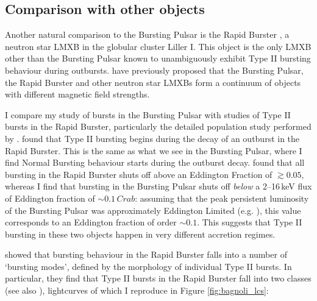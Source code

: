 \subsection{Comparison with other objects}

\par Another natural comparison to the Bursting Pulsar is the Rapid Burster \citep{Lewin_RBDiscovery}, a neutron star LMXB in the globular cluster Liller I.  This object is the only LMXB other than the Bursting Pulsar known to unambiguously exhibit Type II bursting behaviour during outbursts.  \citet{Rappaport_BPHistory} have previously proposed that the Bursting Pulsar, the Rapid Burster and other neutron star LMXBs form a continuum of objects with different magnetic field strengths.
\par I compare my study of bursts in the Bursting Pulsar with studies of Type II bursts in the Rapid Burster, particularly the detailed population study performed by \citet{Bagnoli_PopStudy}.  \citet{Bagnoli_PopStudy} found that Type II bursting begins during the decay of an outburst in the Rapid Burster.  This is the same as what we see in the Bursting Pulsar, where I find Normal Bursting behaviour starts during the outburst decay.  \citet{Bagnoli_PopStudy} found that all bursting in the Rapid Burster shuts off above an Eddington Fraction of $\gtrsim0.05$, whereas I find that bursting in the Bursting Pulsar shuts off \textit{below} a 2--16\,keV flux of Eddington fraction of $\sim0.1\,Crab$: assuming that the peak persistent luminosity of the Bursting Pulsar was approximately Eddington Limited (e.g. \citealp{Sazonov_BPGranat}), this value corresponds to an Eddington fraction of order $\sim0.1$.  This suggests that Type II bursting in these two objects happen in very different accretion regimes.
\par \citet{Bagnoli_PopStudy} showed that bursting behaviour in the Rapid Burster falls into a number of `bursting modes', defined by the morphology of individual Type II bursts.  In particular, they find that Type II bursts in the Rapid Burster fall into two classes (see also \citealp{Marshall_2types}), lightcurves of which I reproduce in Figure \ref{fig:bagnoli_lcs}:

